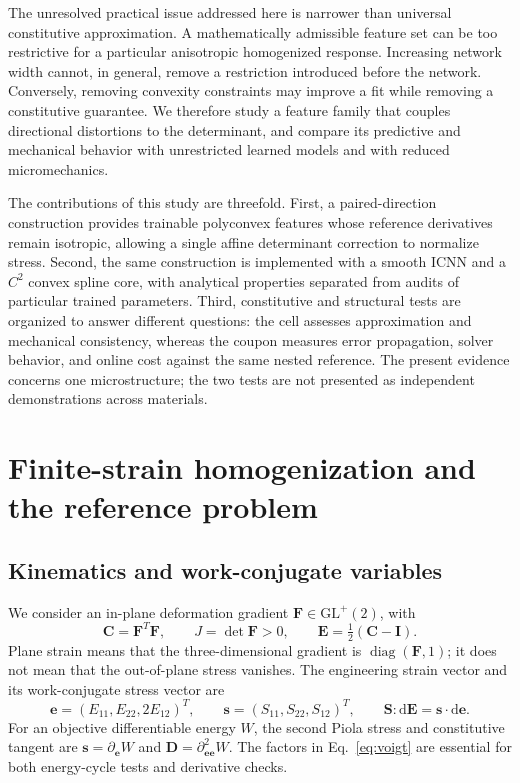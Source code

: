 \documentclass[10pt,a4paper]{article}
\newcommand{\F}{\bm F}
\newcommand{\C}{\bm C}
\newcommand{\E}{\bm E}
\newcommand{\Sg}{\bm S}
\newcommand{\I}{\bm I}
\newcommand{\ee}{\bm e}
\newcommand{\ssv}{\bm s}
\newcommand{\dd}{\mathrm d}
\newcommand{\GL}{\mathrm{GL}^{+}(2)}
\newcommand{\diag}{\operatorname{diag}}
\begin{document}
The unresolved practical issue addressed here is narrower than universal constitutive approximation. A mathematically admissible feature set can be too restrictive for a particular anisotropic homogenized response. Increasing network width cannot, in general, remove a restriction introduced before the network. Conversely, removing convexity constraints may improve a fit while removing a constitutive guarantee. We therefore study a feature family that couples directional distortions to the determinant, and compare its predictive and mechanical behavior with unrestricted learned models and with reduced micromechanics.

The contributions of this study are threefold. First, a paired-direction construction provides trainable polyconvex features whose reference derivatives remain isotropic, allowing a single affine determinant correction to normalize stress. Second, the same construction is implemented with a smooth ICNN and a $C^2$ convex spline core, with analytical properties separated from audits of particular trained parameters. Third, constitutive and structural tests are organized to answer different questions: the cell assesses approximation and mechanical consistency, whereas the coupon measures error propagation, solver behavior, and online cost against the same nested reference. The present evidence concerns one microstructure; the two tests are not presented as independent demonstrations across materials.

\section{Finite-strain homogenization and the reference problem}
\label{sec:fom}
\subsection{Kinematics and work-conjugate variables}
We consider an in-plane deformation gradient $\F\in\GL$, with
\begin{equation}
 \C=\F^T\F,\qquad J=\det\F>0,\qquad
 \E=\tfrac12(\C-\I).
\end{equation}
Plane strain means that the three-dimensional gradient is $\diag(\F,1)$; it does not mean that the out-of-plane stress vanishes. The engineering strain vector and its work-conjugate stress vector are
\begin{equation}
 \ee=(E_{11},E_{22},2E_{12})^T,\qquad
 \ssv=(S_{11},S_{22},S_{12})^T,\qquad
 \Sg:\dd\E=\ssv\cdot\dd\ee.
 \label{eq:voigt}
\end{equation}
For an objective differentiable energy $W$, the second Piola stress and constitutive tangent are $\ssv=\partial_{\ee}W$ and $\bm D=\partial^2_{\ee\ee}W$. The factors in Eq.~\eqref{eq:voigt} are essential for both energy-cycle tests and derivative checks.
\end{document}
